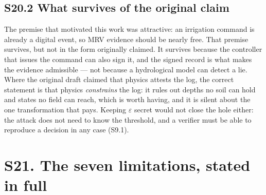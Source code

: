 \subsection*{S20.2 What survives of the original claim}

The premise that motivated this work was attractive: an irrigation command is
already a digital event, so MRV evidence should be nearly free. That premise
survives, but not in the form originally claimed. It survives because the controller that issues the command can also sign it, and the signed record is
what makes the evidence admissible --- not because a hydrological model can
detect a lie. Where the original draft claimed that physics attests the log,
the correct statement is that physics \emph{constrains} the log: it rules out
depths no soil can hold and states no field can reach, which is worth having,
and it is silent about the one transformation that pays. Keeping $\varepsilon$
secret would not close the hole either: the attack does not need to know the
threshold, and a verifier must be able to reproduce a decision in any case
(S9.1).

\section*{S21. The seven limitations, stated in full}

